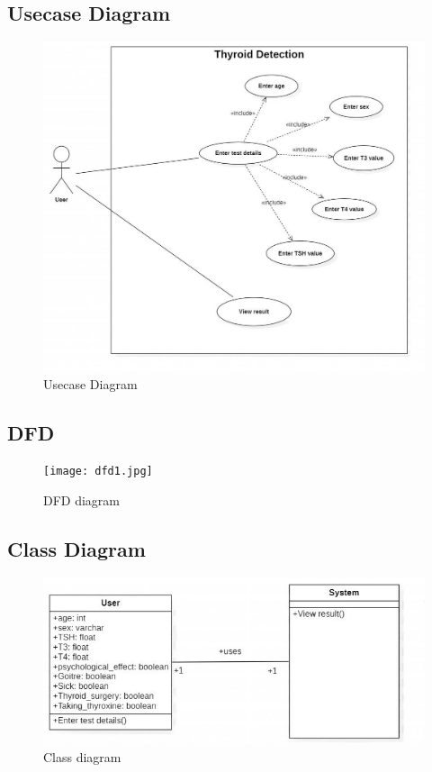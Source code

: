\subsection{Usecase Diagram}

\begin{figure}[h]
\centering
\includegraphics[scale=0.5,width=14cm]{usecase.png}
\caption{Usecase Diagram}
\end{figure}
\subsection{DFD}
\begin{figure}[h]
\centering
\texttt{[image: dfd1.jpg]}
\caption{DFD diagram}
\end{figure}
\subsection{Class Diagram}
\begin{figure}[h]
\centering
\includegraphics[scale=0.5]{class.png}
\caption{Class diagram}
\end{figure}
